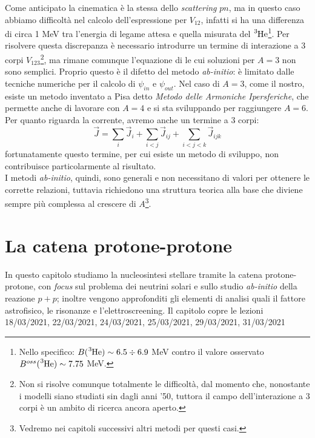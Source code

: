 Come anticipato la cinematica è la stessa dello \textit{scattering} $pn$, ma in questo caso abbiamo difficoltà nel calcolo dell'espressione per $V_{12}$, infatti si ha una differenza di circa 1 MeV tra l'energia di legame attesa e quella misurata del $\ce{^3He}$\footnote{Nello specifico: $B(\ce{^3He})\sim6.5\div 6.9$ MeV contro il valore osservato $B^{oss}(\ce{^3He})\sim7.75$ MeV.%
}. Per risolvere questa discrepanza è necessario introdurre un termine di interazione a 3 corpi $V_{123}$\footnote{Non si risolve comunque totalmente le difficoltà, dal momento che, nonostante i modelli siano studiati sin dagli anni '50, tuttora il campo dell'interazione a 3 corpi è un ambito di ricerca ancora aperto.}, ma rimane comunque l'equazione di \Sch{} le cui soluzioni per $A=3$ non sono semplici. Proprio questo è il difetto del metodo \textit{ab-initio}: è limitato dalle tecniche numeriche per il calcolo di $\psi_{in}$ e $\psi_{out}$. Nel caso di $A=3$, come il nostro, esiste un metodo inventato a Pisa detto \textit{Metodo delle Armoniche Ipersferiche}, che permette anche di lavorare con $A=4$ e si sta sviluppando per raggiungere $A=6$.\\
Per quanto riguarda la corrente, avremo anche un termine a 3 corpi:
$$\vec{J} = \sum_i \vec{J}_i + \sum_{i<j} \vec{J}_{ij} + \sum_{i<j<k} \vec{J}_{ijk}$$
fortunatamente questo termine, per cui esiste un metodo di sviluppo, non contribuisce particolarmente al risultato.\\
I metodi \textit{ab-initio}, quindi, sono generali e non necessitano di  valori per ottenere le corrette relazioni, tuttavia richiedono una struttura teorica alla base che diviene sempre più complessa al crescere di $A$\footnote{Vedremo nei capitoli successivi altri metodi per questi casi.}. 



\chapter{La catena protone-protone}\label{cap-pp}
In questo capitolo studiamo la nucleosintesi stellare tramite la catena protone-protone, con \textit{focus} sul problema dei neutrini solari e sullo studio \textit{ab-initio} della reazione $p+p$; inoltre vengono approfonditi gli elementi di analisi quali il fattore astrofisico, le risonanze e l'elettroscreening. Il capitolo copre le lezioni 18/03/2021, 22/03/2021, 24/03/2021, 25/03/2021, 29/03/2021, 31/03/2021

